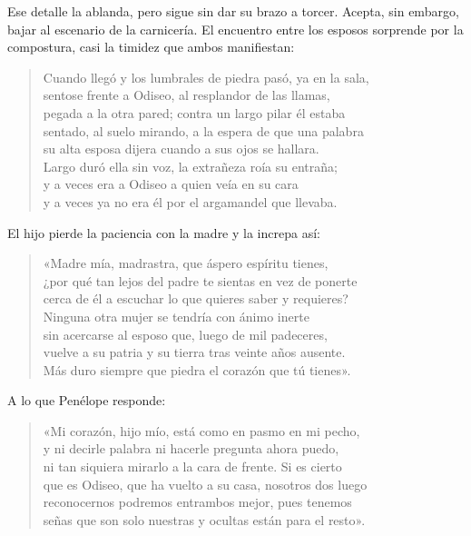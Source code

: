 Ese detalle la ablanda, pero sigue sin dar su brazo a torcer. Acepta, sin embargo, bajar al escenario de la carnicería. El encuentro entre los esposos sorprende por la compostura, casi la timidez que ambos manifiestan:

\begin{verse}
Cuando llegó y los lumbrales de piedra pasó, ya en la sala,\\
sentose frente a Odiseo, al resplandor de las llamas,\\
pegada a la otra pared; contra un largo pilar él estaba\\
sentado, al suelo mirando, a la espera de que una palabra\\
su alta esposa dijera cuando a sus ojos se hallara.\\
Largo duró ella sin voz, la extrañeza roía su entraña;\\
y a veces era a Odiseo a quien veía en su cara\\
y a veces ya no era él por el argamandel que llevaba.
\end{verse}

El hijo pierde la paciencia con la madre y la increpa así:

\begin{verse}
«Madre mía, madrastra, que áspero espíritu tienes,\\
¿por qué tan lejos del padre te sientas en vez de ponerte\\
cerca de él a escuchar lo que quieres saber y requieres?\\
Ninguna otra mujer se tendría con ánimo inerte\\
sin acercarse al esposo que, luego de mil padeceres,\\
vuelve a su patria y su tierra tras veinte años ausente.\\
Más duro siempre que piedra el corazón que tú tienes».
\end{verse}

A lo que Penélope responde:

\begin{verse}
«Mi corazón, hijo mío, está como en pasmo en mi pecho,\\
y ni decirle palabra ni hacerle pregunta ahora puedo,\\
ni tan siquiera mirarlo a la cara de frente. Si es cierto\\
que es Odiseo, que ha vuelto a su casa, nosotros dos luego\\
reconocernos podremos entrambos mejor, pues tenemos\\
señas que son solo nuestras y ocultas están para el resto».
\end{verse}

